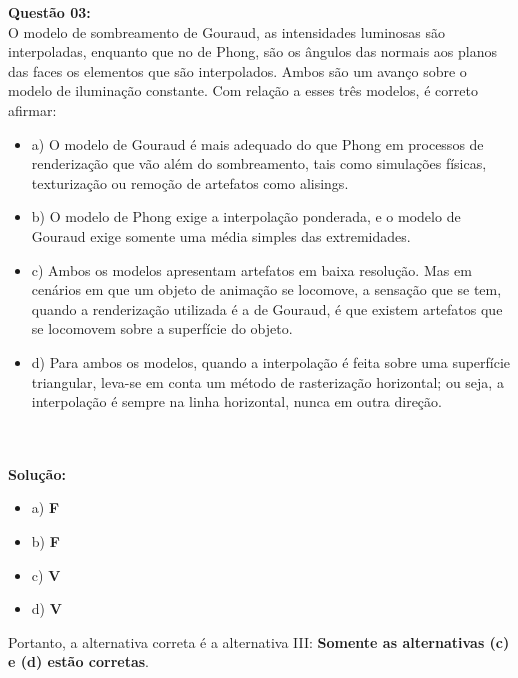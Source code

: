 \noindent\textbf{Questão 03:}\\
O modelo de sombreamento de Gouraud, as intensidades luminosas são interpoladas, enquanto que no de Phong, são os ângulos das normais aos planos das faces os elementos que são interpolados. Ambos são um avanço sobre o modelo de iluminação constante. Com relação a esses três modelos, é correto afirmar:
\begin{itemize}
    \item a) O modelo de Gouraud é mais adequado do que Phong em processos de renderização que vão além do sombreamento, tais como simulações físicas, texturização ou remoção de artefatos como alisings.
    \item b) O modelo de Phong exige a interpolação ponderada, e o modelo de Gouraud exige somente uma média simples das extremidades.
    \item c) Ambos os modelos apresentam artefatos em baixa resolução. Mas em cenários em que um objeto de animação se locomove, a sensação que se tem, quando a renderização utilizada é a de Gouraud, é que existem artefatos que se locomovem sobre a superfície do objeto.
    \item d) Para ambos os modelos, quando a interpolação é feita sobre uma superfície triangular, leva-se em conta um método de rasterização horizontal; ou seja, a interpolação é sempre na linha horizontal, nunca em outra direção.
\end{itemize}\\
\\
\noindent\textbf{Solução:}
\begin{itemize}
    \item a) \textbf{F}
    \item b) \textbf{F}
    \item c) \textbf{V}
    \item d) \textbf{V}
\end{itemize}
Portanto, a alternativa correta é a alternativa III: \textbf{Somente as alternativas (c) e (d) estão corretas}.
\vspace{1cm}

